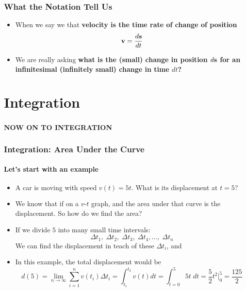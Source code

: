 \documentclass[12pt,compress,aspectratio=169]{beamer}
\newcommand{\mb}[1]{\ensuremath\mathbf{#1}}
\begin{document}
\begin{frame}
  \frametitle{What the Notation Tell Us}
  \begin{itemize}
  \item When we say we that \textbf{velocity is the time rate of change of
    position}
    {\Large
      \begin{displaymath}
        \mb{v}=\frac{d\mb{s}}{dt}
      \end{displaymath}
    }
  \item We are really asking \textbf{what is the (small) change in position
    $d\mb{s}$ for an infinitesimal (infinitely small) change in time $dt$?}
  \end{itemize}
\end{frame}

\section{Integration}

\begin{frame}
  \frametitle{}
  \begin{center}
    {\LARGE\textbf{NOW ON TO INTEGRATION}}
  \end{center}
\end{frame}

\begin{frame}
  \frametitle{Integration: Area Under the Curve}
  \framesubtitle{Let's start with an example}
  \begin{itemize}
  \item A car is moving with speed $v(t)=5t$. What is its displacement at $t=5$?
  \item We know that if on a $v$-$t$ graph, and the area under that curve is
    the displacement. So how do we find the area?
  \item If we divide $5$ into many small time intervals:
    \begin{displaymath}
      \Delta t_1,\;\Delta t_2,\;\Delta t_3,\;\Delta t_4,\ldots,\;\Delta t_n
    \end{displaymath}
    We can find the displacement in teach of these $\Delta t_i$, and
  \item In this example, the total displacement would be  
    \begin{displaymath}
      d(5)=\lim_{n\rightarrow\infty}\sum_{i=1}^{n}v(t_i)\Delta t_i=\int_{t_1}^{t_2}v(t)dt=
      \int_{t=0}^{5}5t\;dt=\frac{5}{2}t^2\Big|^5_0=\frac{125}{2}
    \end{displaymath}
  \end{itemize}
\end{frame}
\end{document}
